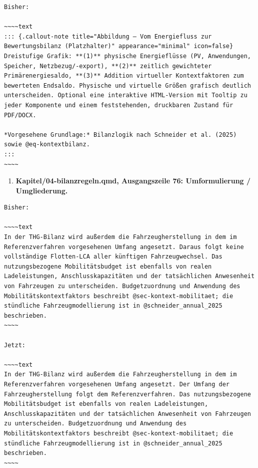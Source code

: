 \documentclass[
  ngerman,
  a4paper,
  DIV=11]{scrreprt}
\providecommand{\tightlist}{%
  \setlength{\itemsep}{0pt}\setlength{\parskip}{0pt}}
\begin{document}
\begin{verbatim}
Bisher:

~~~~text
::: {.callout-note title="Abbildung – Vom Energiefluss zur Bewertungsbilanz (Platzhalter)" appearance="minimal" icon=false}
Dreistufige Grafik: **(1)** physische Energieflüsse (PV, Anwendungen, Speicher, Netzbezug/-export), **(2)** zeitlich gewichteter Primärenergiesaldo, **(3)** Addition virtueller Kontextfaktoren zum bewerteten Endsaldo. Physische und virtuelle Größen grafisch deutlich unterscheiden. Optional eine interaktive HTML-Version mit Tooltip zu jeder Komponente und einem feststehenden, druckbaren Zustand für PDF/DOCX.

*Vorgesehene Grundlage:* Bilanzlogik nach Schneider et al. (2025) sowie @eq-kontextbilanz.
:::
~~~~
\end{verbatim}

\begin{enumerate}
\def\labelenumi{\arabic{enumi}.}
\setcounter{enumi}{112}
\tightlist
\item
  \textbf{Kapitel/04-bilanzregeln.qmd, Ausgangszeile 76: Umformulierung
  / Umgliederung.}
\end{enumerate}

\begin{verbatim}
Bisher:

~~~~text
In der THG-Bilanz wird außerdem die Fahrzeugherstellung in dem im Referenzverfahren vorgesehenen Umfang angesetzt. Daraus folgt keine vollständige Flotten-LCA aller künftigen Fahrzeugwechsel. Das nutzungsbezogene Mobilitätsbudget ist ebenfalls von realen Ladeleistungen, Anschlusskapazitäten und der tatsächlichen Anwesenheit von Fahrzeugen zu unterscheiden. Budgetzuordnung und Anwendung des Mobilitätskontextfaktors beschreibt @sec-kontext-mobilitaet; die stündliche Fahrzeugmodellierung ist in @schneider_annual_2025 beschrieben.
~~~~

Jetzt:

~~~~text
In der THG-Bilanz wird außerdem die Fahrzeugherstellung in dem im Referenzverfahren vorgesehenen Umfang angesetzt. Der Umfang der Fahrzeugherstellung folgt dem Referenzverfahren. Das nutzungsbezogene Mobilitätsbudget ist ebenfalls von realen Ladeleistungen, Anschlusskapazitäten und der tatsächlichen Anwesenheit von Fahrzeugen zu unterscheiden. Budgetzuordnung und Anwendung des Mobilitätskontextfaktors beschreibt @sec-kontext-mobilitaet; die stündliche Fahrzeugmodellierung ist in @schneider_annual_2025 beschrieben.
~~~~
\end{verbatim}
\end{document}
